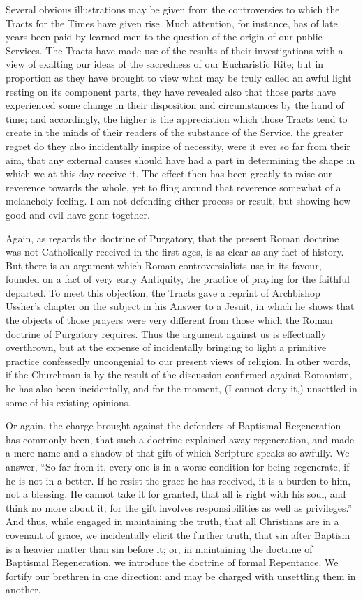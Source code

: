 Several obvious illustrations may be given from
the controversies to which the Tracts for the Times have given rise.
Much attention, for instance, has of late years been paid by learned
men to the question of the origin of our public Services. The Tracts
have made use of the results of their investigations with a view of
exalting our ideas of the sacredness of our Eucharistic Rite; but in
proportion as they have brought to view what may be truly called an
awful light resting on its component parts, they have revealed also
that those parts have experienced some change in their disposition and
circumstances by the hand of time; and accordingly, the higher is the
appreciation which those Tracts tend to create in the minds of their
readers of the substance of the Service, the greater regret do they
also incidentally inspire of necessity, were it ever so far from their
aim, that any external causes should have had a part in determining
the shape in which we at this day receive it. The effect then has been
greatly to raise our reverence towards the whole, yet to fling around
that reverence somewhat of a melancholy feeling. I am not defending
either process or result, but showing how good and evil have gone
together.

Again, as regards the doctrine of Purgatory, that
the present Roman doctrine was not Catholically received in the first
ages, is as clear as any fact of history. But there is an argument
which Roman controversialists use in its favour, founded on a fact of
very early Antiquity, the practice of praying for the faithful
departed. To meet this objection, the Tracts gave a reprint of
Archbishop Ussher's chapter on the subject in his Answer to a Jesuit,
in which he shows that the objects of those prayers were very
different from those which the Roman doctrine of Purgatory requires.
Thus the argument against us is effectually overthrown, but at
the expense of incidentally bringing to light a primitive practice
confessedly uncongenial to our present views of religion. In other
words, if the Churchman is by the result of the discussion confirmed
against Romanism, he has also been incidentally, and for the moment,
(I cannot deny it,) unsettled in some of his existing opinions.

Or again, the charge brought against the
defenders of Baptismal Regeneration has commonly been, that such a
doctrine explained away regeneration, and made a mere name and a
shadow of that gift of which Scripture speaks so awfully. We answer, ``So
far from it, every one is in a worse condition for being regenerate,
if he is not in a better. If he resist the grace he has received, it
is a burden to him, not a blessing. He cannot take it for granted,
that all is right with his soul, and think no more about it; for the
gift involves responsibilities as well as privileges.'' And thus, while
engaged in maintaining the truth, that all Christians are in a
covenant of grace, we incidentally elicit the further truth, that sin
after Baptism is a heavier matter than sin before it; or, in
maintaining the doctrine of Baptismal Regeneration, we introduce the
doctrine of formal Repentance. We fortify our brethren in one
direction; and may be charged with unsettling them in another.

